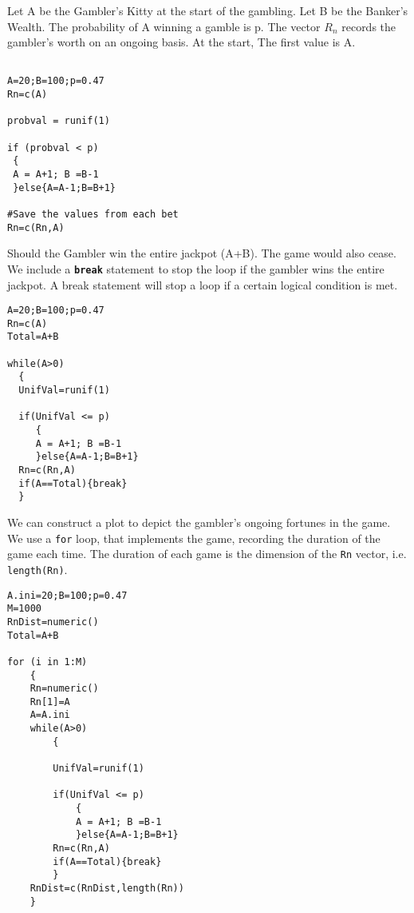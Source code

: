 \documentclass[a4paper,12pt]{article}
\begin{document}
\newpage
Let A be the Gambler's Kitty at the start of the gambling.
Let B be the Banker's Wealth.
The probability of A winning a gamble is p.
The vector $R_n$ records the gambler's worth on an ongoing basis. At the start, The first value is A.
\begin{framed}
\begin{verbatim}

A=20;B=100;p=0.47
Rn=c(A)

probval = runif(1)

if (probval < p)
 {
 A = A+1; B =B-1
 }else{A=A-1;B=B+1}

#Save the values from each bet
Rn=c(Rn,A)
\end{verbatim}
\end{framed}
\newpage
Should the Gambler win the entire jackpot (A+B). The game would also cease. We include a \textbf{\texttt{break}} statement to stop the loop if the gambler wins the entire jackpot. A break statement will stop a loop if a certain logical condition is met.

\begin{framed}
\begin{verbatim}
A=20;B=100;p=0.47
Rn=c(A)
Total=A+B

while(A>0)
  {
  UnifVal=runif(1)

  if(UnifVal <= p)
     {
     A = A+1; B =B-1
     }else{A=A-1;B=B+1}
  Rn=c(Rn,A)
  if(A==Total){break}
  }
\end{verbatim}
\end{framed}
We can construct a plot to depict the gambler's ongoing fortunes in the game. We use a \texttt{for} loop, that implements the game, recording the duration of the game each time. The duration of each game is the dimension of the \texttt{Rn} vector, i.e. \texttt{length(Rn)}.


\begin{framed}
\begin{verbatim}
A.ini=20;B=100;p=0.47
M=1000
RnDist=numeric()
Total=A+B

for (i in 1:M)
    {
    Rn=numeric()
    Rn[1]=A
    A=A.ini
    while(A>0)
        {
       
        UnifVal=runif(1)

        if(UnifVal <= p)
            {
            A = A+1; B =B-1
            }else{A=A-1;B=B+1}
        Rn=c(Rn,A)
        if(A==Total){break}
        }
    RnDist=c(RnDist,length(Rn))
    }
    

\end{verbatim}
\end{framed}
\end{document}

